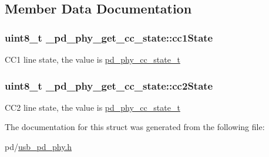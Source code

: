 \subsection{Member Data Documentation}
\hypertarget{struct__pd__phy__get__cc__state_a551804e47b7f897e9e4ca61e0af9caf3}{
\subsubsection[{cc1\-State}]{\setlength{\rightskip}{0pt plus 5cm}uint8\-\_\-t \-\_\-pd\-\_\-phy\-\_\-get\-\_\-cc\-\_\-state\-::cc1\-State}}\label{struct__pd__phy__get__cc__state_a551804e47b7f897e9e4ca61e0af9caf3}
C\-C1 line state, the value is \hyperlink{group__usb__pd__phy__drv_ga33106675227396a51d78ea6a7f562570}{pd\-\_\-phy\-\_\-cc\-\_\-state\-\_\-t} \hypertarget{struct__pd__phy__get__cc__state_af32a14cc7bbfad052b927f765176aac8}{
\subsubsection[{cc2\-State}]{\setlength{\rightskip}{0pt plus 5cm}uint8\-\_\-t \-\_\-pd\-\_\-phy\-\_\-get\-\_\-cc\-\_\-state\-::cc2\-State}}\label{struct__pd__phy__get__cc__state_af32a14cc7bbfad052b927f765176aac8}
C\-C2 line state, the value is \hyperlink{group__usb__pd__phy__drv_ga33106675227396a51d78ea6a7f562570}{pd\-\_\-phy\-\_\-cc\-\_\-state\-\_\-t} 

The documentation for this struct was generated from the following file\-:\begin{DoxyCompactItemize}
\item 
pd/\hyperlink{usb__pd__phy_8h}{usb\-\_\-pd\-\_\-phy.\-h}\end{DoxyCompactItemize}
